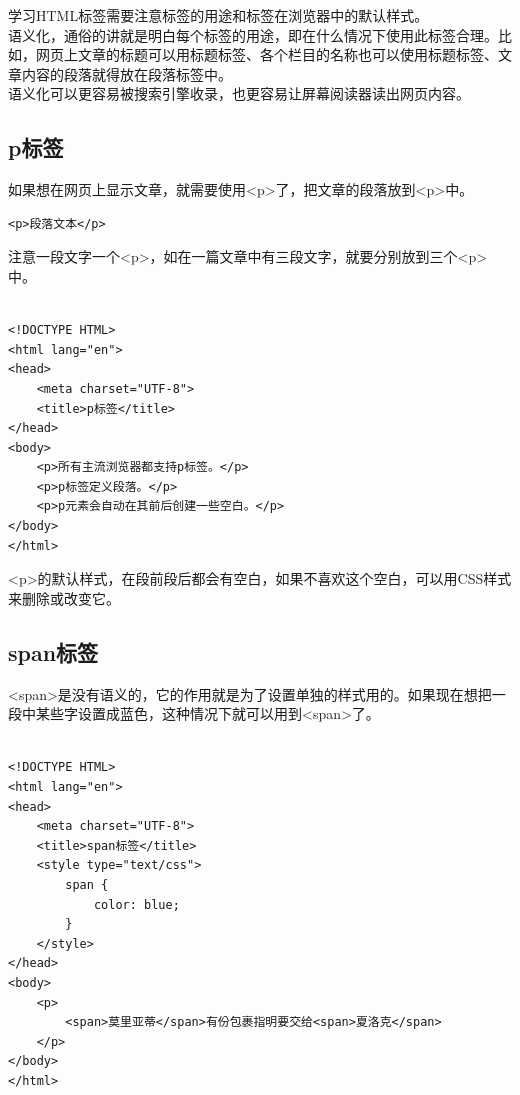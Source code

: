 学习HTML标签需要注意标签的用途和标签在浏览器中的默认样式。\\

语义化，通俗的讲就是明白每个标签的用途，即在什么情况下使用此标签合理。比如，网页上文章的标题可以用标题标签、各个栏目的名称也可以使用标题标签、文章内容的段落就得放在段落标签中。\\

语义化可以更容易被搜索引擎收录，也更容易让屏幕阅读器读出网页内容。\\

\subsection{p标签}

如果想在网页上显示文章，就需要使用<p>了，把文章的段落放到<p>中。\\

\begin{lstlisting}[style=htmlcssjs]
<p>段落文本</p>
\end{lstlisting}

注意一段文字一个<p>，如在一篇文章中有三段文字，就要分别放到三个<p>中。\\

\\

\begin{lstlisting}[style=htmlcssjs]
<!DOCTYPE HTML>
<html lang="en">
<head>
    <meta charset="UTF-8">
    <title>p标签</title>
</head>
<body>
    <p>所有主流浏览器都支持p标签。</p>
    <p>p标签定义段落。</p>
    <p>p元素会自动在其前后创建一些空白。</p>
</body>
</html>
\end{lstlisting}

<p>的默认样式，在段前段后都会有空白，如果不喜欢这个空白，可以用CSS样式来删除或改变它。\\

\subsection{span标签}

<span>是没有语义的，它的作用就是为了设置单独的样式用的。如果现在想把一段中某些字设置成蓝色，这种情况下就可以用到<span>了。\\

\\

\begin{lstlisting}[style=htmlcssjs]
<!DOCTYPE HTML>
<html lang="en">
<head>
    <meta charset="UTF-8">
    <title>span标签</title>
    <style type="text/css">
        span {
            color: blue;
        }
    </style>
</head>
<body>
    <p>
        <span>莫里亚蒂</span>有份包裹指明要交给<span>夏洛克</span>
    </p>
</body>
</html>
\end{lstlisting}


